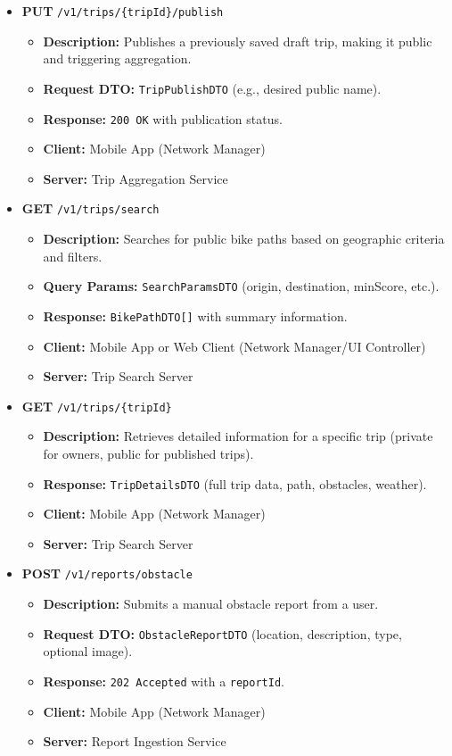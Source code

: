 \begin{itemize}
    \item \textbf{PUT} \texttt{/v1/trips/\{tripId\}/publish}
    \begin{itemize}
        \item \textbf{Description:} Publishes a previously saved draft trip, making it public and triggering aggregation.
        \item \textbf{Request DTO:} \texttt{TripPublishDTO} (e.g., desired public name).
        \item \textbf{Response:} \texttt{200 OK} with publication status.
        \item \textbf{Client:} Mobile App (Network Manager)
        \item \textbf{Server:} Trip Aggregation Service
    \end{itemize}
    
    \item \textbf{GET} \texttt{/v1/trips/search}
    \begin{itemize}
        \item \textbf{Description:} Searches for public bike paths based on geographic criteria and filters.
        \item \textbf{Query Params:} \texttt{SearchParamsDTO} (origin, destination, minScore, etc.).
        \item \textbf{Response:} \texttt{BikePathDTO[]} with summary information.
        \item \textbf{Client:} Mobile App or Web Client (Network Manager/UI Controller)
        \item \textbf{Server:} Trip Search Server
    \end{itemize}
    
    \item \textbf{GET} \texttt{/v1/trips/\{tripId\}}
    \begin{itemize}
        \item \textbf{Description:} Retrieves detailed information for a specific trip (private for owners, public for published trips).
        \item \textbf{Response:} \texttt{TripDetailsDTO} (full trip data, path, obstacles, weather).
        \item \textbf{Client:} Mobile App (Network Manager)
        \item \textbf{Server:} Trip Search Server
    \end{itemize}
    
    \item \textbf{POST} \texttt{/v1/reports/obstacle}
    \begin{itemize}
        \item \textbf{Description:} Submits a manual obstacle report from a user.
        \item \textbf{Request DTO:} \texttt{ObstacleReportDTO} (location, description, type, optional image).
        \item \textbf{Response:} \texttt{202 Accepted} with a \texttt{reportId}.
        \item \textbf{Client:} Mobile App (Network Manager)
        \item \textbf{Server:} Report Ingestion Service
    \end{itemize}
    

\end{itemize}
